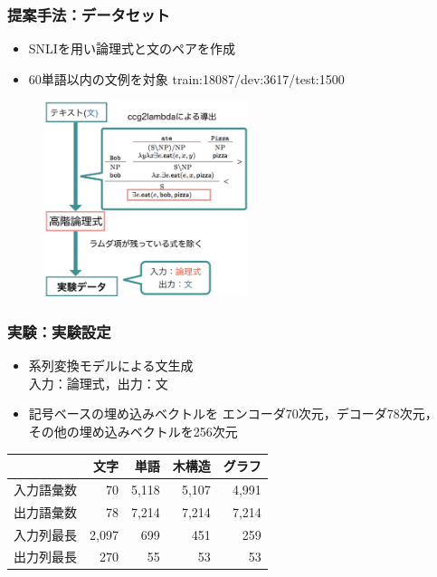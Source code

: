 \documentclass[dvipdfmx,cjk]{beamer}
\begin{document}

\begin{frame}
\frametitle{提案手法：データセット}
\begin{itemize}
  \item
SNLIを用い論理式と文のペアを作成

\item 60単語以内の文例を対象
train:18087/dev:3617/test:1500\\

\end{itemize}
\begin{center}
\begin{figure}[h]
	\includegraphics[width=6cm]{edit_data.png}
        \label{fig:editdata}
\end{figure}
\end{center}

\end{frame}

\begin{frame}
\frametitle{実験：実験設定}
\begin{itemize}
  \item 系列変換モデルによる文生成 \\
入力：論理式，出力：文\\
\item 記号ベースの埋め込みベクトルを
エンコーダ70次元，デコーダ78次元，\\
その他の埋め込みベクトルを256次元
\end{itemize}

\begin{center}
  \begin{tabular}{rrrrr}
    \hline
    　  & 文字 & 単語 & 木構造 & グラフ \\
    \hline \hline
    入力語彙数  & 70  &  5,118 & 5,107 & 4,991\\
    出力語彙数  & 78   & 7,214 & 7,214 & 7,214\\
    入力列最長 & 2,097  & 699 & 451 & 259 \\
    出力列最長 & 270  & 55 & 53 & 53 \\
    \hline
  \end{tabular}
\end{center}
\end{frame}
\end{document}
